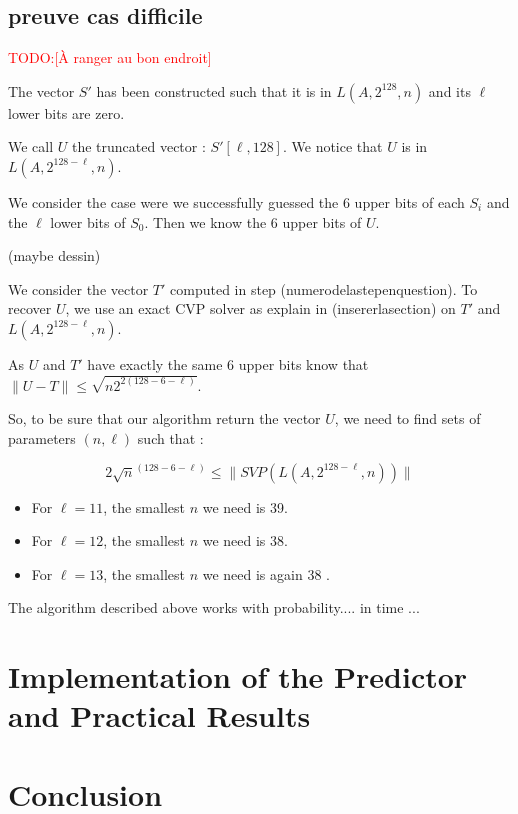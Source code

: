 \documentclass[preprint,svgnames]{iacrtrans}
\newcommand{\todo}[1]{\textcolor{red}{TODO:[#1]}}
\begin{document}
\subsection{preuve cas difficile}
\todo{À ranger au bon endroit}

The vector \(S'\) has been constructed such that it is in \(L(A,2^{128},n)\) and its \(\ell\) lower bits are zero.

We call \(U\) the truncated vector : \(S'[\ell,128]\). We notice that \(U\) is in \(L(A,2^{128-\ell},n)\).

We consider the case were we successfully guessed the 6 upper bits of each \(S_i\) and the \(\ell\) lower bits of \(S_0\). Then we know the 6 upper bits of \(U\).

(maybe dessin)


We consider the vector \(T'\) computed in step (numerodelastepenquestion). To recover \(U\), we use an exact CVP solver as explain in  (insererlasection) on \(T'\) and \(L(A,2^{128-\ell},n)\).

As \(U\) and \(T'\) have exactly the same \(6\) upper bits  know that \(\lVert U-T \rVert \leqslant \sqrt{n2^{2(128-6-\ell)}}\).

So, to be sure that our algorithm return the vector \(U\), we need to find sets of parameters \((n,\ell)\) such that :	 

\[2\sqrt{n}^{(128-6-\ell)} \leqslant \lVert SVP(L(A,2^{128-\ell},n))\rVert \]

\begin{itemize}
	\item For \(\ell=11\), the smallest \(n\) we need is 39.
	
	\item For \(\ell=12\), the smallest \(n\) we need is 38.
	
	\item For \(\ell=13\), the smallest \(n\) we need is again 38 .
	
\end{itemize} 

\begin{theorem}
  The algorithm described above works with probability.... in time ...
\end{theorem}

\section{Implementation of the Predictor and Practical Results}

\section{Conclusion}




\end{document}
